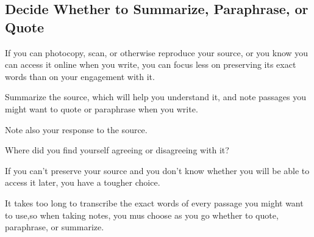 \documentclass[oneside]{book}
\numberwithin{equation}{section}
\begin{document}
\subsection{Decide Whether to Summarize, Paraphrase, or Quote}
If you can photocopy, scan, or otherwise reproduce your source, or you know you can access it online when you write, you can focus less on preserving its exact words than on your engagement with it.

Summarize the source, which will help you understand it, and note passages you might want to quote or paraphrase when you write.

Note also your response to the source.

Where did you find yourself agreeing or disagreeing with it?

%
If you can't preserve your source and you don't know whether you will be able to access it later, you have a tougher choice.

It takes too long to transcribe the exact words of every passage you might want to use,so when taking notes, you mus choose as you go whether to quote, paraphrase, or summarize.
\end{document}
